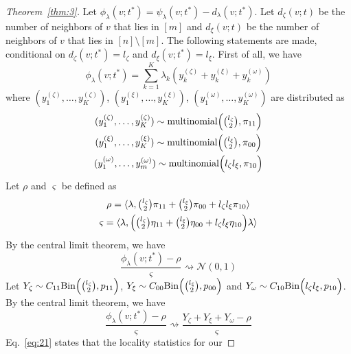 \documentclass[draftcls]{IEEEtran}
\theoremstyle{definition}
\begin{document}
\begin{proof}[Theorem~\ref{thm:3}]
  Let $\phi_{\lambda}(v;t^{*}) = \psi_{\lambda}(v;t^{*}) -
  d_{\lambda}(v;t^{*})$. Let $d_{\zeta}(v;t)$ be
the number of neighbors of $v$ that lies in $[m]$ and
$d_{\xi}(v;t)$ be the number of neighbors of $v$ that lies in $[n]
\setminus [m]$. The following statements are made, conditional on $d_{\zeta}(v;t^{*}) =
l_{\zeta}$ and $d_{\xi}(v;t^{*}) = l_{\xi}$. First of all, we have
\begin{equation}
  \phi_{\lambda}(v;t^{*}) = \sum_{k=1}^{K} \lambda_k ( y^{(\zeta)}_k +
  y^{(\xi)}_k + y^{(\omega)}_k)
\end{equation}
where $(y^{(\zeta)}_1, \dots, y^{(\zeta)}_K)$, $(y^{(\xi)}_1,\dots,
 y^{(\xi)}_K)$,  $(y^{(\omega)}_1, \dots, y^{(\omega)}_K)$ are
 distributed as
\begin{gather*}
(y^{(\zeta)}_1,\dots,y^{(\zeta)}_K) \sim \textrm{multinomial}\Bigl(
\tbinom{l_\zeta}{2}, \pi_{11}\Bigr) \\ 
(y^{(\xi)}_1,\dots,y^{(\xi)}_K) \sim \textrm{multinomial}\Bigl(
\tbinom{l_\xi}{2}, \pi_{00}\Bigr) \\
(y^{(\omega)}_1,\dots,y^{(\omega)}_m) \sim \textrm{multinomial}\Bigl(
l_\zeta l_\xi, \pi_{10}\Bigr)
\end{gather*}
Let $\rho$ and $\varsigma$ be defined as
\begin{gather*}
  \rho = \langle \lambda, \tbinom{l_{\zeta}}{2} \pi_{11} +
  \tbinom{l_{\xi}}{2} \pi_{00} + l_{\zeta} l_{\xi} \pi_{10} \rangle \\
  \varsigma = \langle \lambda, \Bigl(\tbinom{l_{\zeta}}{2} \eta_{11} +
  \tbinom{l_{\xi}}{2} \eta_{00} + l_{\zeta} l_{\xi} \eta_{10}\Bigr) \lambda
  \rangle
\end{gather*}
By the central limit theorem, we have
\begin{equation}
  \label{eq:16}
  \frac{\phi_{\lambda}(v;t^{*}) - \rho}{\varsigma} \rightsquigarrow
  \mathcal{N}(0,1)
\end{equation}
Let $Y_{\zeta} \sim C_{11} \mathrm{Bin}\Bigl(\tbinom{l_{\zeta}}{2},
p_{11}\Bigr)$, $Y_{\xi} \sim C_{00} \mathrm{Bin}\Bigl(\tbinom{l_\xi}{2},
p_{00}\Bigr)$ and $Y_{\omega} \sim C_{10} \mathrm{Bin}\Bigl( l_{\zeta}
l_{\xi}, p_{10} \Bigr)$. By the central limit theorem, we have
\begin{equation}
  \label{eq:21}
 \frac{\phi_{\lambda}(v;t^{*}) - \rho}{\varsigma} \rightsquigarrow
 \frac{Y_{\zeta} + Y_{\xi} + Y_{\omega} - \rho}{\varsigma}
\end{equation}
Eq.~\eqref{eq:21} states that the locality statistics for our

\end{proof}
\end{document}
